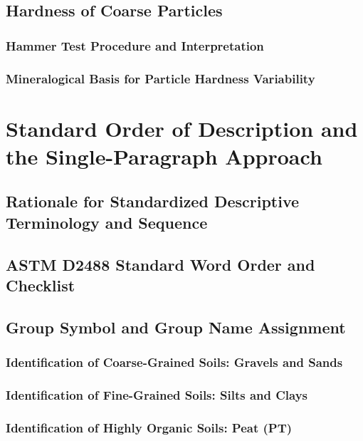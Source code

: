 \subsection{Hardness of Coarse Particles}

\subsubsection{Hammer Test Procedure and Interpretation}

\subsubsection{Mineralogical Basis for Particle Hardness Variability}

\section{Standard Order of Description and the Single-Paragraph Approach}

\subsection{Rationale for Standardized Descriptive Terminology and Sequence}

\subsection{ASTM D2488 Standard Word Order and Checklist}

\subsection{Group Symbol and Group Name Assignment}

\subsubsection{Identification of Coarse-Grained Soils: Gravels and Sands}

\subsubsection{Identification of Fine-Grained Soils: Silts and Clays}

\subsubsection{Identification of Highly Organic Soils: Peat (PT)}

